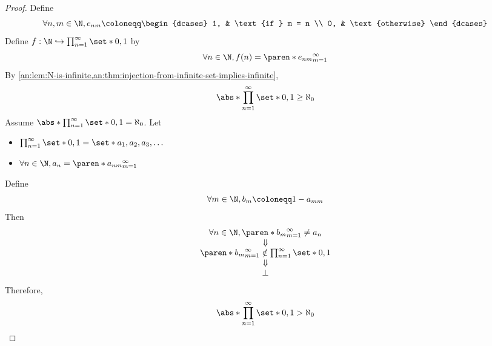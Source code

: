 \begin{proof}
  Define
  \[
    \forall n, m \in \N, e_{nm} \coloneqq \begin{dcases}
      1, & \text{if } m = n \\
      0, & \text{otherwise}
    \end{dcases}
  \]
  Define $f: \N \hookrightarrow \prod_{n = 1}^{\infty} \set*{0, 1}$ by
  \[
    \forall n \in \N, f(n) = \paren*{e_{nm}}_{m = 1}^{\infty}
  \]
  By \cref{an:lem:N-is-infinite,an:thm:injection-from-infinite-set-implies-infinite},
  \[
    \abs*{\prod_{n = 1}^{\infty} \set*{0, 1}} \geq \aleph_{0}
  \]
  Assume $\abs*{\prod_{n = 1}^{\infty} \set*{0, 1}} = \aleph_{0}$. Let
  \begin{itemize}
    \item $\prod_{n = 1}^{\infty} \set*{0, 1} = \set*{a_{1}, a_{2}, a_{3}, \dots}$
    \item $\forall n \in \N, a_{n} = \paren*{a_{nm}}_{m = 1}^{\infty}$
  \end{itemize}
  Define
  \[
    \forall m \in \N, b_{m} \coloneqq 1 - a_{mm}
  \]
  Then
  \[
    \begin{array}{c}
      \forall n \in \N, \paren*{b_{m}}_{m = 1}^{\infty} \neq a_{n}              \\
      \Downarrow                                                                \\
      \paren*{b_{m}}_{m = 1}^{\infty} \notin \prod_{n = 1}^{\infty} \set*{0, 1} \\
      \Downarrow                                                                \\
      \bot
    \end{array}
  \]
  Therefore,
  \[
    \abs*{\prod_{n = 1}^{\infty} \set*{0, 1}} > \aleph_{0}
  \]
\end{proof}
